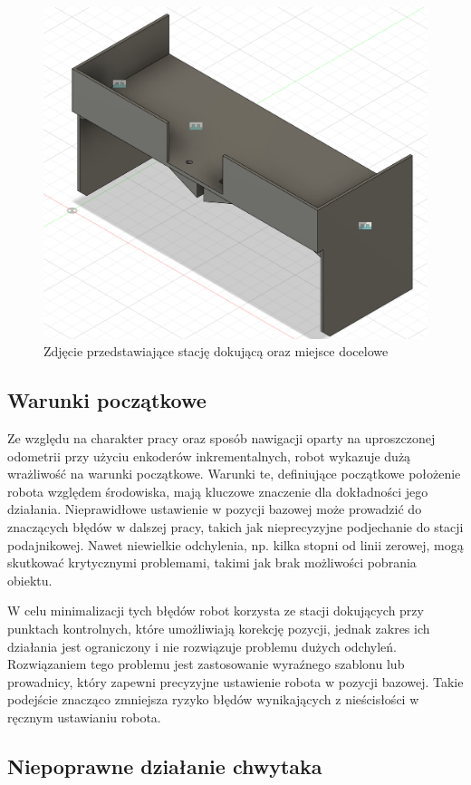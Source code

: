 \begin{figure}
    \centering
    \includegraphics[width=1.0\textwidth]{./graf/upper.png}
    \caption{Zdjęcie przedstawiające stację dokującą oraz miejsce docelowe}
    \label{fig:stacja}
\end{figure}

\subsection{Warunki początkowe}

Ze względu na charakter pracy oraz sposób nawigacji oparty na uproszczonej odometrii przy użyciu enkoderów inkrementalnych, robot wykazuje dużą wrażliwość na warunki początkowe. Warunki te, definiujące początkowe położenie robota względem środowiska, mają kluczowe znaczenie dla dokładności jego działania. Nieprawidłowe ustawienie w pozycji bazowej może prowadzić do znaczących błędów w dalszej pracy, takich jak nieprecyzyjne podjechanie do stacji podajnikowej. Nawet niewielkie odchylenia, np. kilka stopni od linii zerowej, mogą skutkować krytycznymi problemami, takimi jak brak możliwości pobrania obiektu.

W celu minimalizacji tych błędów robot korzysta ze stacji dokujących przy punktach kontrolnych, które umożliwiają korekcję pozycji, jednak zakres ich działania jest ograniczony i nie rozwiązuje problemu dużych odchyleń. Rozwiązaniem tego problemu jest zastosowanie wyraźnego szablonu lub prowadnicy, który zapewni precyzyjne ustawienie robota w pozycji bazowej. Takie podejście znacząco zmniejsza ryzyko błędów wynikających z nieścisłości w ręcznym ustawianiu robota.

\subsection{Niepoprawne działanie chwytaka}


